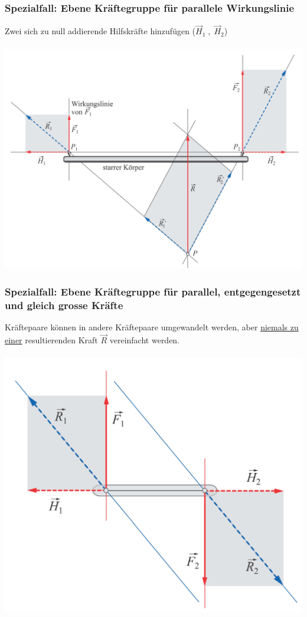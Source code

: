 		\subsubsection{Spezialfall: Ebene Kräftegruppe für parallele Wirkungslinie}
			Zwei sich zu null addierende Hilfskräfte hinzufügen ($\vec{H}_1 \; , \; \vec{H}_2$) \\
			\\	
			\includegraphics[width=0.7\linewidth]{Bilder/parallele_wirkungslinien}

		\subsubsection{Spezialfall: Ebene Kräftegruppe für parallel, entgegengesetzt und gleich grosse Kräfte}
	
			Kräftepaare können in andere Kräftepaare umgewandelt  werden, aber \underline{niemals zu einer} resultierenden Kraft $\vec{R}$ vereinfacht werden. \\
			\\
			\includegraphics[width=0.7\linewidth]{Bilder/kraeftepaar_wirkungslinien}
		
